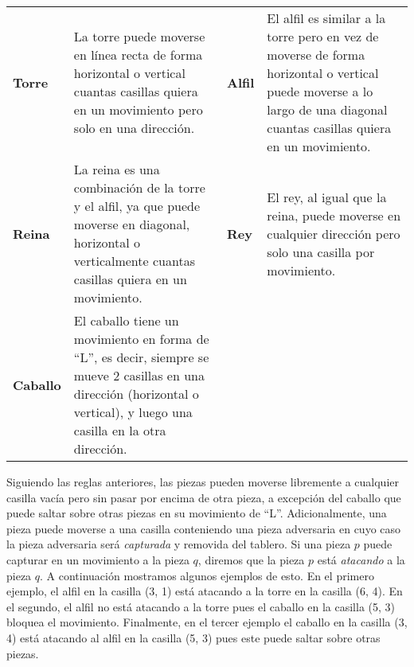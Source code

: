 \documentclass{oci}
\begin{document}
\begin{problemDescription}
\newcommand{\boardsmall}[1][]{\scalebox{0.75}{\chessboard[#1]}}
\newcommand{\vadj}{\vspace{0em}}
\def\arraystretch{1.5}
\setlength{\tabcolsep}{0em}
\begin{tabularx}{\textwidth}[t]{AB@{\hspace{.03\textwidth}}AB}
  \textbf{Torre}
  \boardsmall[setpieces={rc3}, markfields={c1,c2,c4,c5,a3,b3,d3,e3}]
  &
  \vadj
  La torre puede moverse en línea recta de forma horizontal o vertical cuantas casillas quiera en
  un movimiento pero solo en una dirección.

  &
  \textbf{Alfil}

  \boardsmall[setpieces={bc3}, markfields={a1,b2,d4,e5,a5,b4,d2,e1}]
  &
  \vadj
  El alfil es similar a la torre pero en vez de moverse de forma horizontal o vertical
  puede moverse a lo largo de una diagonal cuantas casillas quiera en un movimiento.
  \\

  \textbf{Reina}
  \boardsmall[setpieces={qc3}, markfields={a1,b2,d4,e5,a5,b4,d2,e1,c1,c2,c4,c5,a3,b3,d3,e3}]
  &
  \vspace{0.1em}
  La reina es una combinación de la torre y el alfil, ya que puede moverse en diagonal,
  horizontal o verticalmente cuantas casillas quiera en un movimiento.

  &
  \textbf{Rey}
  \boardsmall[setpieces={kc3}, markfields={b2,d4,b4,d2,c2,c4,b3,d3}]
  &
  \vspace{0.2em}
  El rey, al igual que la reina, puede moverse en cualquier dirección pero solo una casilla por
  movimiento.
  \\

  \textbf{Caballo}
  \boardsmall[setpieces={nc3}, markfields={a4,a2,b5,b1,d5,d1,e4,e2}]
  &
  \vspace{0.1em}
  El caballo tiene un movimiento en forma de ``L'', es decir, siempre se mueve
  2 casillas en una dirección (horizontal o vertical), y luego una casilla en la otra dirección.
\end{tabularx}

Siguiendo las reglas anteriores, las piezas pueden moverse libremente a cualquier casilla vacía
pero sin pasar por encima de otra pieza, a excepción del caballo que puede saltar sobre otras
piezas en su movimiento de ``L''.
Adicionalmente, una pieza puede moverse a una casilla conteniendo una pieza adversaria en cuyo
caso la pieza adversaria será \emph{capturada} y removida del tablero.
Si una pieza $p$ puede capturar en un movimiento a la pieza $q$,
diremos que la pieza $p$ está \emph{atacando} a la pieza $q$.
A continuación mostramos algunos ejemplos de esto.
En el primero ejemplo, el alfil en la casilla (3, 1) está atacando a la torre en la casilla (6, 4).
En el segundo, el alfil no está atacando a la torre pues el caballo en la casilla (5, 3)
bloquea el movimiento.
Finalmente, en el tercer ejemplo el caballo en la casilla (3, 4) está atacando al alfil
en la casilla (5, 3) pues este puede saltar sobre otras piezas.


\end{problemDescription}
\end{document}
